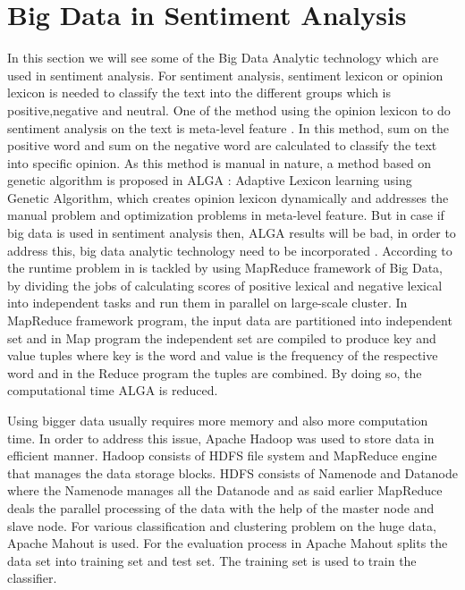 \documentclass[sigconf]{acmart}
\begin{document}
\section{Big Data in Sentiment Analysis}
In this section we will see some of the Big Data Analytic technology which are used in sentiment analysis. For sentiment analysis, sentiment lexicon or opinion lexicon is needed to classify the text into the different groups which is positive,negative and neutral. One of the method using the opinion lexicon to do sentiment analysis on the text is meta-level feature \cite{BRAVOMARQUEZ201486}. In this method, sum on the positive word and sum on the negative word are calculated to classify the text into specific opinion. As this method is manual in nature, a method based on genetic algorithm is proposed in \cite{KESHAVARZ20171} ALGA : Adaptive Lexicon learning using Genetic Algorithm, which creates opinion lexicon dynamically and addresses the manual problem and optimization problems in meta-level feature. But in case if big data is used in sentiment analysis then, ALGA results will be bad, in order to address this, big data analytic technology need to be incorporated \cite{bigdatainsenti}. According to \cite{bigdatainsenti} the runtime problem in \cite{KESHAVARZ20171} is tackled by using MapReduce framework of Big Data, by dividing the jobs of calculating scores of positive lexical and negative lexical into independent tasks and run them in parallel on large-scale cluster. In MapReduce framework program, the input data are partitioned into independent set and in Map program the independent set are compiled to produce key and value tuples where key is the word and value is the frequency of the respective word and in the Reduce program the tuples are combined. By doing so, the computational time ALGA \cite{KESHAVARZ20171} is reduced. 

Using bigger data usually requires more memory and also more computation time. In order to address this issue, Apache Hadoop \cite{hadoopsenti} was used to store data in efficient manner. Hadoop consists of HDFS file system and MapReduce engine that manages the data storage blocks. HDFS consists of Namenode and Datanode \cite{hadoopsenti} where the Namenode manages all the Datanode and as said earlier MapReduce deals the parallel processing of the data with the help of the master node and slave node. For various classification and clustering problem on the huge data, Apache Mahout \cite{hadoopsenti} is used. For the evaluation process in \cite{hadoopsenti} Apache Mahout splits the data set into training set and test set. The training set is used to train the classifier.
\end{document}
